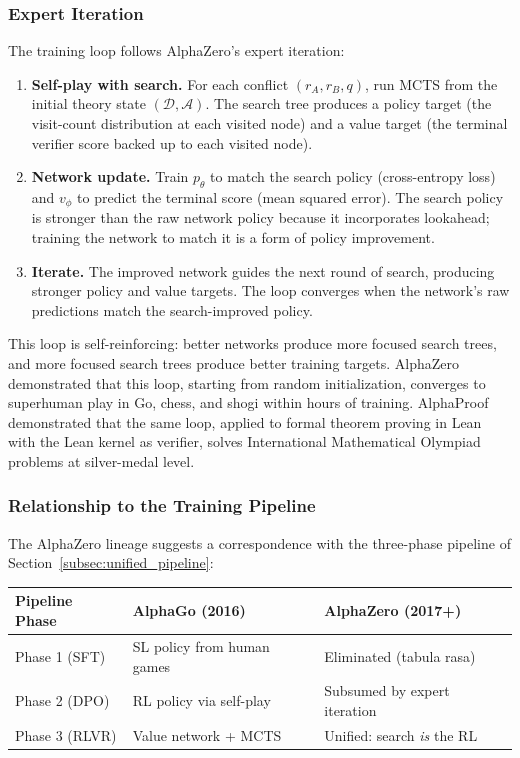 \documentclass{article}
\theoremstyle{definition}
\newcommand{\D}{\mathcal{D}}
\begin{document}
\subsubsection{Expert Iteration}

The training loop follows AlphaZero's expert iteration:
\begin{enumerate}[nosep]
    \item \textbf{Self-play with search.} For each conflict $(r_A, r_B, q)$, run MCTS from the initial theory state $(\D, \mathcal{A})$. The search tree produces a policy target (the visit-count distribution at each visited node) and a value target (the terminal verifier score backed up to each visited node).
    \item \textbf{Network update.} Train $p_\theta$ to match the search policy (cross-entropy loss) and $v_\phi$ to predict the terminal score (mean squared error). The search policy is stronger than the raw network policy because it incorporates lookahead; training the network to match it is a form of policy improvement.
    \item \textbf{Iterate.} The improved network guides the next round of search, producing stronger policy and value targets. The loop converges when the network's raw predictions match the search-improved policy.
\end{enumerate}

This loop is self-reinforcing: better networks produce more focused search trees, and more focused search trees produce better training targets. AlphaZero demonstrated that this loop, starting from random initialization, converges to superhuman play in Go, chess, and shogi within hours of training. AlphaProof~\cite{alphaproof2025} demonstrated that the same loop, applied to formal theorem proving in Lean with the Lean kernel as verifier, solves International Mathematical Olympiad problems at silver-medal level.

\subsubsection{Relationship to the Training Pipeline}

The AlphaZero lineage suggests a correspondence with the three-phase pipeline of Section~\ref{subsec:unified_pipeline}:

\begin{center}
\small
\begin{tabular}{@{}lll@{}}
\toprule
Pipeline Phase & AlphaGo (2016) & AlphaZero (2017+) \\
\midrule
Phase 1 (SFT) & SL policy from human games & Eliminated (tabula rasa) \\
Phase 2 (DPO) & RL policy via self-play & Subsumed by expert iteration \\
Phase 3 (RLVR) & Value network + MCTS & Unified: search \emph{is} the RL \\
\bottomrule
\end{tabular}
\end{center}
\end{document}
